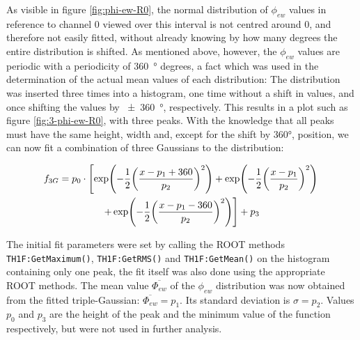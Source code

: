 	As visible in figure \ref{fig:phi-ew-R0}, the normal distribution of $\phi_{ew}$ values in reference to channel 0 viewed over this interval is not centred around 0, and therefore not easily fitted, without already knowing by how many degrees the entire distribution is shifted. 
	As mentioned above, however, the $\phi_{ew}$ values are periodic with a periodicity of \SI{360}{\degree} degrees, a fact which was used in the determination of the actual mean values of each distribution:
	The distribution was inserted three times into a histogram, one time without a shift in values, and once shifting the values by \SI{\pm 360}{\degree}, respectively.
    This results in a plot such as figure \ref{fig:3-phi-ew-R0}, with three peaks. With the knowledge that all peaks must have the same height, width and, except for the shift by 360°, position, we can now fit a combination of three Gaussians to the distribution:
    
    \begin{multline}
        f_{3G} = p_0 \cdot \left[\exp(-\frac{1}{2}\qty(\frac{x-p_1+360}{p_2})^2) + \exp(-\frac{1}{2}\qty(\frac{x-p_1}{p_2})^2) \right. \\ 
        \left. + \exp(-\frac{1}{2}\qty(\frac{x-p_1-360}{p_2})^2)\right] + p_3
    \end{multline}
    
    The initial fit parameters were set by calling the ROOT methods \lstinline|TH1F:GetMaximum()|, \lstinline|TH1F:GetRMS()| and \lstinline|TH1F:GetMean()| on the histogram containing only one peak, the fit itself was also done using the appropriate ROOT methods.
    The mean value $\overline{\Phi_{ew}}$ of the $\phi_{ew}$ distribution was now obtained from the fitted triple-Gaussian: $ \overline{\Phi_{ew}} = p_1$. Its standard deviation is $\sigma = p_2$. Values $p_0$ and $p_3$ are the height of the peak and the minimum value of the function respectively, but were not used in further analysis.
    
